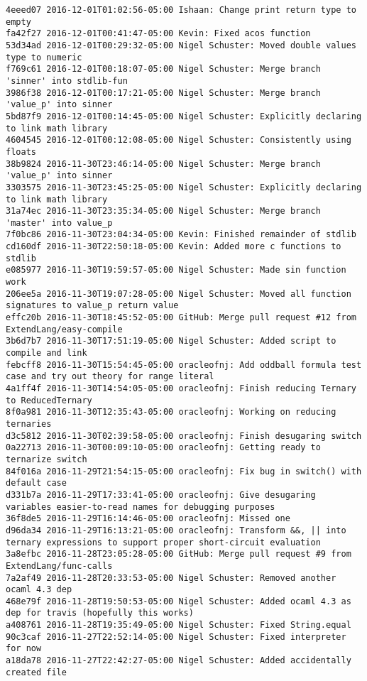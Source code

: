\begin{lstlisting}
4eeed07 2016-12-01T01:02:56-05:00 Ishaan: Change print return type to empty
fa42f27 2016-12-01T00:41:47-05:00 Kevin: Fixed acos function
53d34ad 2016-12-01T00:29:32-05:00 Nigel Schuster: Moved double values type to numeric
f769c61 2016-12-01T00:18:07-05:00 Nigel Schuster: Merge branch 'sinner' into stdlib-fun
3986f38 2016-12-01T00:17:21-05:00 Nigel Schuster: Merge branch 'value_p' into sinner
5bd87f9 2016-12-01T00:14:45-05:00 Nigel Schuster: Explicitly declaring to link math library
4604545 2016-12-01T00:12:08-05:00 Nigel Schuster: Consistently using floats
38b9824 2016-11-30T23:46:14-05:00 Nigel Schuster: Merge branch 'value_p' into sinner
3303575 2016-11-30T23:45:25-05:00 Nigel Schuster: Explicitly declaring to link math library
31a74ec 2016-11-30T23:35:34-05:00 Nigel Schuster: Merge branch 'master' into value_p
7f0bc86 2016-11-30T23:04:34-05:00 Kevin: Finished remainder of stdlib
cd160df 2016-11-30T22:50:18-05:00 Kevin: Added more c functions to stdlib
e085977 2016-11-30T19:59:57-05:00 Nigel Schuster: Made sin function work
206ee5a 2016-11-30T19:07:28-05:00 Nigel Schuster: Moved all function signatures to value_p return value
effc20b 2016-11-30T18:45:52-05:00 GitHub: Merge pull request #12 from ExtendLang/easy-compile
3b6d7b7 2016-11-30T17:51:19-05:00 Nigel Schuster: Added script to compile and link
febcff8 2016-11-30T15:54:45-05:00 oracleofnj: Add oddball formula test case and try out theory for range literal
4a1ff4f 2016-11-30T14:54:05-05:00 oracleofnj: Finish reducing Ternary to ReducedTernary
8f0a981 2016-11-30T12:35:43-05:00 oracleofnj: Working on reducing ternaries
d3c5812 2016-11-30T02:39:58-05:00 oracleofnj: Finish desugaring switch
0a22713 2016-11-30T00:09:10-05:00 oracleofnj: Getting ready to ternarize switch
84f016a 2016-11-29T21:54:15-05:00 oracleofnj: Fix bug in switch() with default case
d331b7a 2016-11-29T17:33:41-05:00 oracleofnj: Give desugaring variables easier-to-read names for debugging purposes
36f8de5 2016-11-29T16:14:46-05:00 oracleofnj: Missed one
d96da34 2016-11-29T16:13:21-05:00 oracleofnj: Transform &&, || into ternary expressions to support proper short-circuit evaluation
3a8efbc 2016-11-28T23:05:28-05:00 GitHub: Merge pull request #9 from ExtendLang/func-calls
7a2af49 2016-11-28T20:33:53-05:00 Nigel Schuster: Removed another ocaml 4.3 dep
468e79f 2016-11-28T19:50:53-05:00 Nigel Schuster: Added ocaml 4.3 as dep for travis (hopefully this works)
a408761 2016-11-28T19:35:49-05:00 Nigel Schuster: Fixed String.equal
90c3caf 2016-11-27T22:52:14-05:00 Nigel Schuster: Fixed interpreter for now
a18da78 2016-11-27T22:42:27-05:00 Nigel Schuster: Added accidentally created file

\end{lstlisting}
